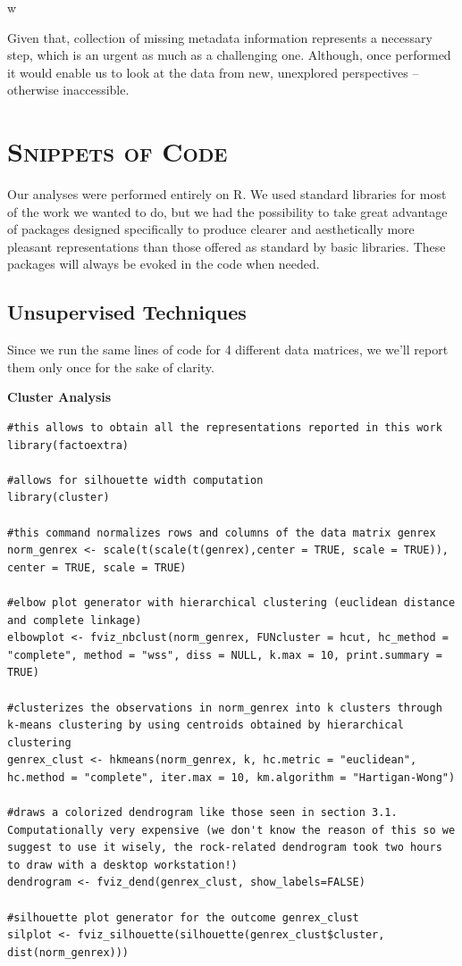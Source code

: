 w\documentclass[11pt, oneside]{article}
\begin{document}
Given that, collection of missing metadata information represents a necessary step, which is an urgent as much as a challenging one. Although, once performed it would enable us to look at the data from new, unexplored perspectives -- otherwise inaccessible.
\newpage

\appendix
\section[Snippets of Code]{\textsc{Snippets of Code}}

Our analyses were performed entirely on R. We used standard libraries for most of the work we wanted to do, but we had the possibility to take great advantage of packages designed specifically to produce clearer and aesthetically more pleasant representations than those offered as standard by basic libraries. These packages will always be evoked in the code when needed.

\subsection{Unsupervised Techniques}
Since we run the same lines of code for 4 different data matrices, we we'll report them only once for the sake of clarity.

\vspace{1cm}

\noindent\textbf{Cluster Analysis}
\begin{lstlisting}
#this allows to obtain all the representations reported in this work
library(factoextra)

#allows for silhouette width computation
library(cluster)

#this command normalizes rows and columns of the data matrix genrex
norm_genrex <- scale(t(scale(t(genrex),center = TRUE, scale = TRUE)), center = TRUE, scale = TRUE)

#elbow plot generator with hierarchical clustering (euclidean distance and complete linkage)
elbowplot <- fviz_nbclust(norm_genrex, FUNcluster = hcut, hc_method = "complete", method = "wss", diss = NULL, k.max = 10, print.summary = TRUE)

#clusterizes the observations in norm_genrex into k clusters through k-means clustering by using centroids obtained by hierarchical clustering
genrex_clust <- hkmeans(norm_genrex, k, hc.metric = "euclidean", hc.method = "complete", iter.max = 10, km.algorithm = "Hartigan-Wong")

#draws a colorized dendrogram like those seen in section 3.1. Computationally very expensive (we don't know the reason of this so we suggest to use it wisely, the rock-related dendrogram took two hours to draw with a desktop workstation!)
dendrogram <- fviz_dend(genrex_clust, show_labels=FALSE)

#silhouette plot generator for the outcome genrex_clust
silplot <- fviz_silhouette(silhouette(genrex_clust$cluster, dist(norm_genrex)))
\end{lstlisting}
\end{document}
